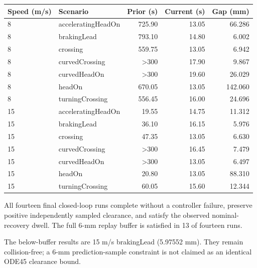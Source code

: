 \begin{longtable}{llrrr}

\toprule

Speed (m/s) & Scenario & Prior (s) & Current (s) & Gap (mm) \\

\midrule

\endhead

8 & acceleratingHeadOn & 725.90 & 13.05 & 66.286 \\

8 & brakingLead & 793.10 & 14.80 & 6.002 \\

8 & crossing & 559.75 & 13.05 & 6.942 \\

8 & curvedCrossing & >300 & 17.90 & 9.867 \\

8 & curvedHeadOn & >300 & 19.60 & 26.029 \\

8 & headOn & 670.05 & 13.05 & 142.060 \\

8 & turningCrossing & 556.45 & 16.00 & 24.696 \\

15 & acceleratingHeadOn & 19.55 & 14.75 & 11.312 \\

15 & brakingLead & 36.10 & 16.15 & 5.976 \\

15 & crossing & 47.35 & 13.05 & 6.630 \\

15 & curvedCrossing & >300 & 16.45 & 7.479 \\

15 & curvedHeadOn & >300 & 13.05 & 6.497 \\

15 & headOn & 20.80 & 13.05 & 88.310 \\

15 & turningCrossing & 60.05 & 15.60 & 12.344 \\

\bottomrule

\end{longtable}

All fourteen final closed-loop runs complete without a controller failure, preserve positive independently sampled clearance, and satisfy the observed nominal-recovery dwell. The full 6-mm replay buffer is satisfied in 13 of fourteen runs.

The below-buffer results are 15 m/s brakingLead (5.97552 mm). They remain collision-free; a 6-mm prediction-sample constraint is not claimed as an identical ODE45 clearance bound.

